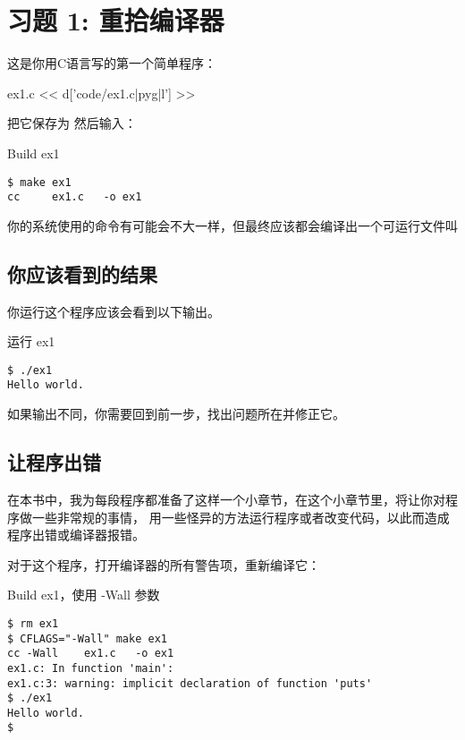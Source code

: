 \chapter{习题 1: 重拾编译器}

这是你用C语言写的第一个简单程序：

\begin{code}{ex1.c}
<< d['code/ex1.c|pyg|l'] >>
\end{code}

把它保存为  然后输入：

\begin{Terminal}{Build ex1}
\begin{lstlisting}
$ make ex1
cc     ex1.c   -o ex1
\end{lstlisting}
\end{Terminal}

你的系统使用的命令有可能会不大一样，但最终应该都会编译出一个可运行文件叫 

\section{你应该看到的结果}

你运行这个程序应该会看到以下输出。

\begin{Terminal}{运行 ex1}
\begin{lstlisting}
$ ./ex1
Hello world.
\end{lstlisting}
\end{Terminal}

如果输出不同，你需要回到前一步，找出问题所在并修正它。

\section{让程序出错}

在本书中，我为每段程序都准备了这样一个小章节，在这个小章节里，将让你对程序做一些非常规的事情，
用一些怪异的方法运行程序或者改变代码，以此而造成程序出错或编译器报错。

对于这个程序，打开编译器的所有警告项，重新编译它：

\begin{Terminal}{Build ex1，使用 -Wall 参数}
\begin{lstlisting}
$ rm ex1
$ CFLAGS="-Wall" make ex1
cc -Wall    ex1.c   -o ex1
ex1.c: In function 'main':
ex1.c:3: warning: implicit declaration of function 'puts'
$ ./ex1
Hello world.
$ 
\end{lstlisting}
\end{Terminal}


